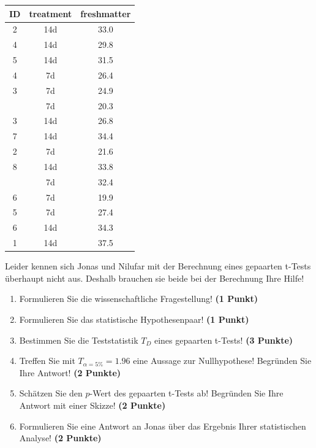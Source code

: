 \documentclass[a4paper, 9pt]{scrartcl}\usepackage[]{graphicx}\usepackage[]{xcolor}
\begin{document}
\begin{table}[!h]
\centering
\begin{tabular}{ccc}
\toprule
ID & treatment & freshmatter\\
\midrule
2 & 14d & 33.0\\
4 & 14d & 29.8\\
5 & 14d & 31.5\\
4 & 7d & 26.4\\
3 & 7d & 24.9\\
\addlinespace
1 & 7d & 20.3\\
3 & 14d & 26.8\\
7 & 14d & 34.4\\
2 & 7d & 21.6\\
8 & 14d & 33.8\\
\addlinespace
7 & 7d & 32.4\\
6 & 7d & 19.9\\
5 & 7d & 27.4\\
6 & 14d & 34.3\\
1 & 14d & 37.5\\
\bottomrule
\end{tabular}
\end{table}



Leider kennen sich Jonas und Nilufar mit der Berechnung eines gepaarten t-Tests überhaupt nicht aus. Deshalb brauchen sie beide bei der Berechnung Ihre Hilfe!

\begin{enumerate}
  \item Formulieren Sie die wissenschaftliche Fragestellung! \textbf{(1 Punkt)}
  \item Formulieren Sie das statistische Hypothesenpaar! \textbf{(1 Punkt)}
  \item Bestimmen Sie die Teststatistik $T_{D}$ eines gepaarten t-Tests! \textbf{(3 Punkte)}
  \item Treffen Sie mit $T_{\alpha = 5\%} = 1.96$ eine Aussage zur Nullhypothese! Begründen Sie Ihre Antwort! \textbf{(2 Punkte)}
\item Schätzen Sie den $p$-Wert des gepaarten t-Tests ab! Begründen Sie Ihre Antwort mit einer Skizze! \textbf{(2 Punkte)}
\item Formulieren Sie eine Antwort an Jonas über das Ergebnis Ihrer statistischen Analyse! \textbf{(2 Punkte)}
\end{enumerate}


 
\clearpage
\end{document}
